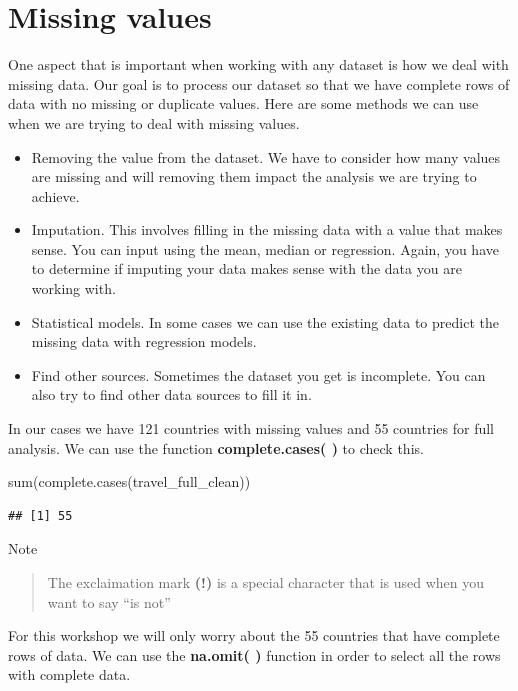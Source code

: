 \documentclass[
]{book}
\newenvironment{Shaded}{\begin{snugshade}}{\end{snugshade}}
\newcommand{\FunctionTok}[1]{\textcolor[rgb]{0.00,0.00,0.00}{#1}}
\newcommand{\NormalTok}[1]{#1}
\begin{document}
\hypertarget{missing-values}{%
\section{Missing values}\label{missing-values}}

One aspect that is important when working with any dataset is how we deal with missing data. Our goal is to process our dataset so that we have complete rows of data with no missing or duplicate values. Here are some methods we can use when we are trying to deal with missing values.

\begin{itemize}
\item
  Removing the value from the dataset. We have to consider how many values are missing and will removing them impact the analysis we are trying to achieve.
\item
  Imputation. This involves filling in the missing data with a value that makes sense. You can input using the mean, median or regression. Again, you have to determine if imputing your data makes sense with the data you are working with.
\item
  Statistical models. In some cases we can use the existing data to predict the missing data with regression models.
\item
  Find other sources. Sometimes the dataset you get is incomplete. You can also try to find other data sources to fill it in.
\end{itemize}

In our cases we have 121 countries with missing values and 55 countries for full analysis. We can use the function \textbf{complete.cases( )} to check this.

\begin{Shaded}
\begin{Highlighting}[]
\FunctionTok{sum}\NormalTok{(}\FunctionTok{complete.cases}\NormalTok{(travel\_full\_clean))}
\end{Highlighting}
\end{Shaded}

\begin{verbatim}
## [1] 55
\end{verbatim}

Note

\begin{quote}
The exclaimation mark \textbf{(!)} is a special character that is used when you want to say ``is not''
\end{quote}

For this workshop we will only worry about the 55 countries that have complete rows of data. We can use the \textbf{na.omit( )} function in order to select all the rows with complete data.
\end{document}
